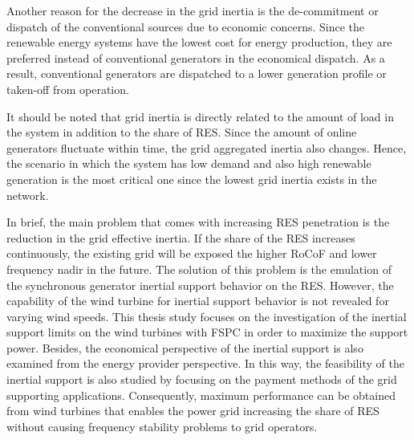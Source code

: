 Another reason for the decrease in the grid inertia is the de-commitment or dispatch of the conventional sources due to economic concerns. Since the renewable energy systems have the lowest cost for energy production, they are preferred instead of conventional generators in the economical dispatch. As a result, conventional generators are dispatched to a lower generation profile or taken-off from operation.\par
It should be noted that grid inertia is directly related to the amount of load in the system in addition to the share of RES. Since the amount of online generators fluctuate within time, the grid aggregated inertia also changes. Hence, the scenario in which the system has low demand and also high renewable generation is the most critical one since the lowest grid inertia exists in the network.\par
In brief, the main problem that comes with increasing RES penetration is the reduction in the grid effective inertia. If the share of the RES increases continuously, the existing grid will be exposed the higher RoCoF and lower frequency nadir in the future. The solution of this problem is the emulation of the synchronous generator inertial support behavior on the RES. However, the capability of the wind turbine for inertial support behavior is not revealed for varying wind speeds. This thesis study focuses on the investigation of the inertial support limits on the wind turbines with FSPC in order to maximize the support power. Besides, the economical perspective of the inertial support is also examined from the energy provider perspective. In this way, the feasibility of the inertial support is also studied by focusing on the payment methods of the grid supporting applications. Consequently, maximum performance can be obtained from wind turbines that enables the power grid increasing the share of RES without causing frequency stability problems to grid operators.
